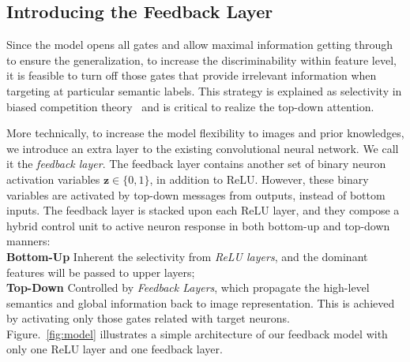\subsection{Introducing the Feedback Layer}
Since the model opens all gates and allow maximal information getting through to ensure the generalization, to increase the discriminability within feature level, it is feasible to turn off those gates that provide irrelevant information when targeting at particular semantic labels. This strategy is explained as selectivity in biased competition theory~\cite{desimone1995neural} and is critical to realize the top-down attention.

More technically, to increase the model flexibility to images and prior knowledges, we introduce an extra layer to the existing convolutional neural network. We call it the \emph{feedback layer}. The feedback layer contains another set of binary neuron activation variables $\mathbf{z} \in \{0, 1\}$, in addition to ReLU. However, these binary variables are activated by top-down messages from outputs, instead of bottom inputs.
%
The feedback layer is stacked upon each ReLU layer, and they compose a hybrid control unit to active neuron response in both bottom-up and top-down manners:
\\\textbf{Bottom-Up} Inherent the selectivity from \emph{ReLU layers}, and the dominant features will be passed to upper layers;
\\\textbf{Top-Down} Controlled by \emph{Feedback Layers}, which propagate the high-level semantics and global information back to image representation. This is achieved by activating only those gates related with target neurons.
\\Figure.~\ref{fig:model} illustrates a simple architecture of our feedback model with only one ReLU layer and one feedback layer.

